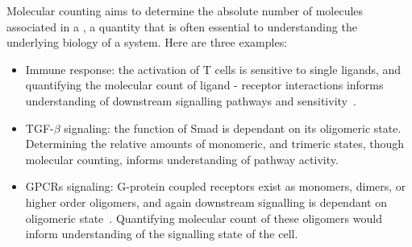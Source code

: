Molecular counting aims to determine the absolute number of molecules
  associated in a \object, a quantity that is often essential to understanding the
  underlying biology of a system. 
  Here are three examples:
  \begin{itemize}

    \item Immune response: the activation of T cells is sensitive to single ligands, and quantifying 
      the molecular count of ligand - receptor interactions informs understanding of downstream signalling pathways and sensitivity~\cite{irvine_2002}.

    \item TGF-$\beta$ signaling: the function of Smad is dependant on its oligomeric state. Determining the relative 
      amounts of monomeric, and trimeric states, though molecular counting, informs understanding of pathway activity.

    \item GPCRs signaling: G-protein coupled receptors exist as monomers, dimers, or higher order oligomers, 
      and again downstream signalling is dependant on oligomeric state~\cite{felce_2018, breitwieser_2004}.
      Quantifying molecular count of these oligomers would inform understanding of the signalling state of the cell.

  \end{itemize}


